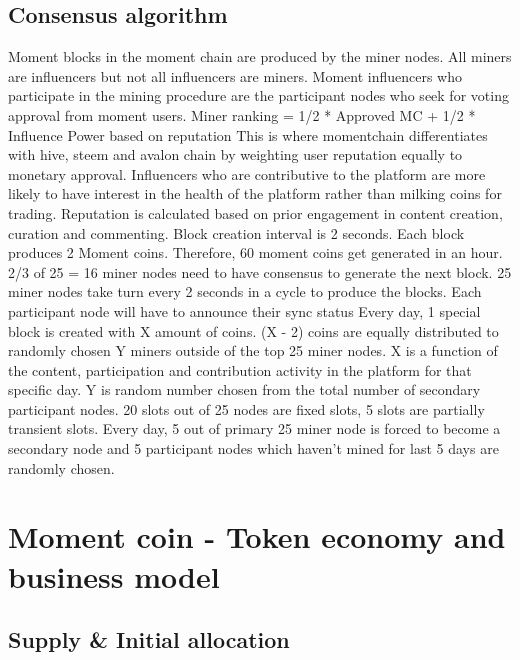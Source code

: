 \documentclass[a4paper]{article}
\begin{document}
\subsection{Consensus algorithm}
 Moment blocks in the moment chain are produced by the miner nodes. All miners are influencers but not all influencers are miners. Moment influencers who participate in the mining procedure are the participant nodes who seek for voting approval from moment users. 
   Miner ranking = 1/2 * Approved MC + 1/2 * Influence Power based on reputation
 This is where momentchain differentiates with hive, steem and avalon chain by weighting user reputation equally to monetary approval. Influencers who are contributive to the platform are more likely to have interest in the health of the platform rather than milking coins for trading.
 Reputation is calculated based on prior engagement in content creation, curation and commenting.
 Block creation interval is 2 seconds. Each block produces 2 Moment coins. Therefore, 60 moment coins get generated in an hour. 
 2/3 of 25 = 16 miner nodes need to have consensus to generate the next block. 25 miner nodes take turn every 2 seconds in a cycle to produce the blocks. Each participant node will have to announce their sync status
 Every day, 1 special block is created with X amount of coins. (X - 2) coins are equally distributed to randomly chosen Y miners outside of the top 25 miner nodes. X is a function of the content, participation and contribution activity in the platform for that specific day. Y is random number chosen from the total number of secondary participant nodes.
 20 slots out of 25 nodes are fixed slots, 5 slots are partially transient slots. Every day, 5 out of primary 25 miner node is forced to become a secondary node and 5 participant nodes which haven't mined for last 5 days are randomly chosen. 
 
  

\section{Moment coin - Token economy and business model}
\subsection{Supply & Initial allocation}



\end{document}
